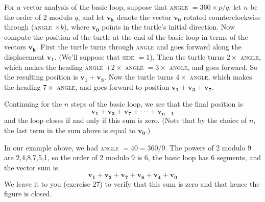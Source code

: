 \documentclass{book}
\begin{document}
For a vector analysis of the basic loop, suppose that \textsc{angle} $= 360 \times p/q$, 
let $n$ be the order of 2 modulo $q$, and let $\mathbf{v_k}$ denote the vector
$\mathbf{v_0}$ rotated counterclockwise through (\textsc{angle} $\times k$), where $\mathbf{v_0}$ points in the turtle's initial direction. Now compute the position of the turtle at
the end of the basic loop in terms of the vectors $\mathbf{v_k}$. First the turtle
turns through \textsc{angle} and goes forward along the displacement $\mathbf{v_1}$. (We'll
suppose that \textsc{side} $= 1$). Then the turtle turns $2 \times$ \textsc{angle}, which makes
the heading \textsc{angle} $+ 2 \times$ \textsc{angle} $= 3 \times $ \textsc{angle}, and goes forward. So
the resulting position is $\mathbf{v_1} + \mathbf{v_3}$. Now the turtle turns $4 \times$ \textsc{angle}, which
makes the heading $7 \times $ \textsc{angle}, and goes forward to position $\mathbf{v_1} + \mathbf{v_3} + \mathbf{v_7}$.

Continuing for the $n$ steps of the basic loop, we see that the final position
is $$\mathbf{v_1} + \mathbf{v_3} + \mathbf{v_7} + \cdot \cdot \cdot+\mathbf{v_{n-1}}$$ and the loop closes if and only if this sum is zero. (Note that by the
choice of $n$, the last term in the sum above is equal to $\mathbf{v_0}$.)

In our example above, we had \textsc{angle} $= 40 = 360/9$. The powers of
2 modulo 9 are 2,4,8,7,5,1, so the order of 2 modulo 9 is 6, the basic
loop has 6 segments, and the vector sum is
$$\mathbf{v_1} + \mathbf{v_3} + \mathbf{v_7} + \mathbf{v_6} + \mathbf{v_4} + \mathbf{v_0}$$
We leave it to you (exercise 27) to verify that this sum is zero and that
hence the figure is closed.
\end{document}
